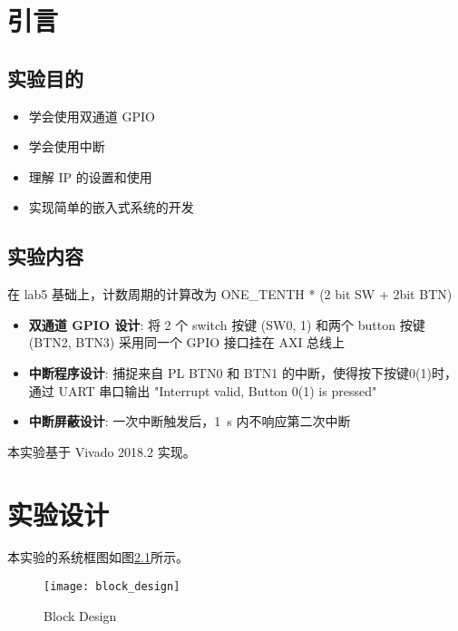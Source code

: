 \documentclass{sjtureport}
\begin{document}



\tableofcontents



\chapter{引言}

\section{实验目的}

\begin{itemize}
	\item 学会使用双通道 GPIO
	\item 学会使用中断
	\item 理解 IP 的设置和使用
	\item 实现简单的嵌入式系统的开发
\end{itemize}

\section{实验内容}

在 lab5 基础上，计数周期的计算改为 ONE\_TENTH * (2 bit SW + 2bit BTN)

\begin{itemize}
	\item \textbf{双通道 GPIO 设计}: 将 2 个 switch 按键 (SW0, 1) 和两个 button 按键 (BTN2, BTN3) 采用同一个 GPIO 接口挂在 AXI 总线上
	\item \textbf{中断程序设计}: 捕捉来自 PL BTN0 和 BTN1 的中断，使得按下按键0(1)时，通过 UART 串口输出 "Interrupt valid, Button 0(1) is pressed"
	\item \textbf{中断屏蔽设计}: 一次中断触发后，\SI{1}{\s} 内不响应第二次中断
\end{itemize}

本实验基于 Vivado 2018.2 实现。

\chapter{实验设计}

本实验的系统框图如图\ref{fig:block-design}所示。

\begin{figure}[!htp]
	\centering
	\texttt{[image: block\_design]}
	\caption{Block Design}
	\label{fig:block-design}
\end{figure}
\end{document}
